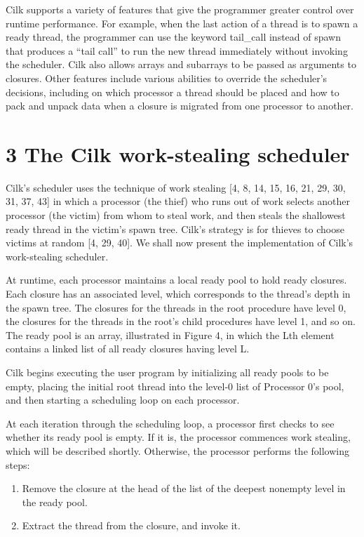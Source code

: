 \documentclass[
]{article}
\newcounter{none} %
\providecommand{\tightlist}{%
  \setlength{\itemsep}{0pt}\setlength{\parskip}{0pt}}
\begin{document}
Cilk supports a variety of features that give the programmer greater
control over runtime performance. For example, when the last action of a
thread is to spawn a ready thread, the programmer can use the keyword
tail\_call instead of spawn that produces a ``tail call'' to run the new
thread immediately without invoking the scheduler. Cilk also allows
arrays and subarrays to be passed as arguments to closures. Other
features include various abilities to override the scheduler's
decisions, including on which processor a thread should be placed and
how to pack and unpack data when a closure is migrated from one
processor to another.

\section{3 The Cilk work-stealing
scheduler}\label{the-cilk-work-stealing-scheduler}

Cilk's scheduler uses the technique of work stealing {[}4, 8, 14, 15,
16, 21, 29, 30, 31, 37, 43{]} in which a processor (the thief) who runs
out of work selects another processor (the victim) from whom to steal
work, and then steals the shallowest ready thread in the victim's spawn
tree. Cilk's strategy is for thieves to choose victims at random {[}4,
29, 40{]}. We shall now present the implementation of Cilk's
work-stealing scheduler.

At runtime, each processor maintains a local ready pool to hold ready
closures. Each closure has an associated level, which corresponds to the
thread's depth in the spawn tree. The closures for the threads in the
root procedure have level 0, the closures for the threads in the root's
child procedures have level 1, and so on. The ready pool is an array,
illustrated in Figure 4, in which the Lth element contains a linked list
of all ready closures having level L.

Cilk begins executing the user program by initializing all ready pools
to be empty, placing the initial root thread into the level-0 list of
Processor 0's pool, and then starting a scheduling loop on each
processor.

At each iteration through the scheduling loop, a processor first checks
to see whether its ready pool is empty. If it is, the processor
commences work stealing, which will be described shortly. Otherwise, the
processor performs the following steps:

\begin{enumerate}
\def\labelenumi{\arabic{enumi}.}
\tightlist
\item
  Remove the closure at the head of the list of the deepest nonempty
  level in the ready pool.\\
\item
  Extract the thread from the closure, and invoke it.
\end{enumerate}
\end{document}
